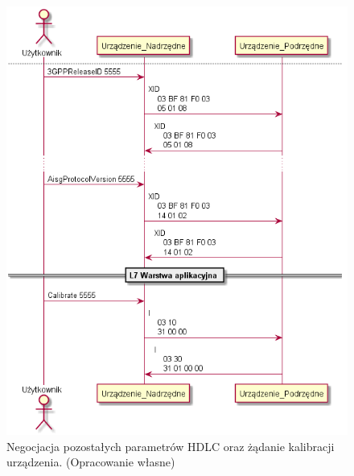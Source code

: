 \begin{figure}[h!]
    \centering
    \includegraphics[scale=0.75]{out/Diagramy/UML_DiagramOfSequence_New/UML_DiagramOfSequence_New-page4.png}
    \caption{Negocjacja pozostałych parametrów HDLC oraz żądanie kalibracji urządzenia.
    \newline(Opracowanie własne)}
    \label{fig:DiagramSequence_3GPP_AISGVersion_Calibrate}
\end{figure}

\newpage
